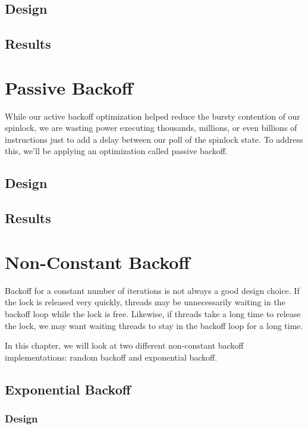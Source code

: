\documentclass[11pt,fancy,authoryear]{elegantbook}
\begin{document}
\section{Design}

\section{Results}

\chapter{Passive Backoff}

While our active backoff optimization helped reduce the bursty contention of our spinlock, we are wasting power executing thousands, millions, or even billions of instructions just to add a delay between our poll of the spinlock state. To address this, we'll be applying an optimization called passive backoff.

\section{Design}

\section{Results}

\chapter{Non-Constant Backoff}

Backoff for a constant number of iterations is not always a good design choice. If the lock is released very quickly, threads may be unnecessarily waiting in the backoff loop while the lock is free. Likewise, if threads take a long time to release the lock, we may want waiting threads to stay in the backoff loop for a long time.

In this chapter, we will look at two different non-constant backoff implementations: random backoff and exponential backoff.

\section{Exponential Backoff}

\subsection{Design}
\end{document}
